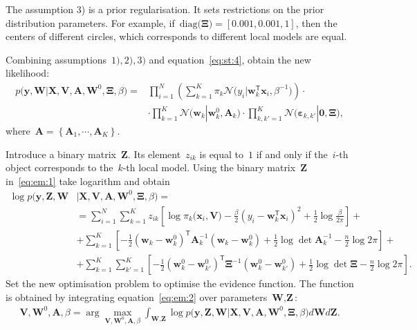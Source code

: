 \documentclass[12pt, twoside]{article}
\numberwithin{equation}{section}
\begin{document}
The assumption 3) is a prior regularisation. It sets restrictions on the prior distribution parameters. For example, if~$\text{diag}\bigr(\bm{\Xi}\bigr)=[0.001, 0.001, 1]$, then the centers of different circles, which corresponds to different local models are equal.

Combining assumptions~$1), 2), 3)$ and equation~\eqref{eq:st:4}, obtain the new likelihood:
\[
\label{eq:em:1}
\begin{aligned}
p\bigr(\mathbf{y}, \mathbf{W}|\mathbf{X}, \mathbf{V}, \textbf{A}, \textbf{W}^{0}, \bm{\Xi}, \beta\bigr) = &\prod_{i=1}^{N}\left(\sum_{k=1}^{K}\pi_{k}\mathcal{N}\bigr(y_{i}|\mathbf{w}_{k}^{\mathsf{T}}\mathbf{x}_{i}, \beta^{-1}\bigr)\right)\cdot\\
&\cdot\prod_{k=1}^{K}\mathcal{N}\bigr(\mathbf{w}_{k}|\mathbf{w}^{0}_{k}, \mathbf{A}_{k}\bigr)\cdot\prod_{k,k'=1}^{K}\mathcal{N}\bigr(\bm{\varepsilon}_{k,k'}|\mathbf{0},  \bm{\Xi}\bigr),
\end{aligned}
\]
 where~$\mathbf{A} = \left\{\mathbf{A}_1, \cdots, \mathbf{A}_K\right\}.$
 
Introduce a binary matrix~$\mathbf{Z}$. Its element~$z_{ik}$ is equal to~$1$ if and only if the~$i$-th object corresponds to the~$k$-th local model.
Using the binary matrix~$\mathbf{Z}$ in~\eqref{eq:em:1} take logarithm and obtain
\[
\label{eq:em:2}
\begin{aligned}
\log p\bigr(\mathbf{y}, \mathbf{Z}, \mathbf{W}&|\mathbf{X}, \mathbf{V}, \textbf{A}, \textbf{W}^{0},  \bm{\Xi}, \beta\bigr) =\\
&= \sum_{i=1}^{N}\sum_{k=1}^{K}z_{ik}\left[\log\pi_k\bigr(\textbf{x}_i, \textbf{V}\bigr) - \frac{\beta}{2}\left(y_{i} - \textbf{w}_{k}^{\mathsf{T}}\textbf{x}_{i}\right)^{2} + \frac{1}{2}\log\frac{\beta}{2\pi}\right] +\\
&+ \sum_{k=1}^{K}\left[-\frac{1}{2}\left(\textbf{w}_{k} - \textbf{w}_{k}^{0}\right)^{\mathsf{T}}\textbf{A}_{k}^{-1}\left(\textbf{w}_{k} - \textbf{w}_{k}^{0}\right) + \frac{1}{2}\log\det\textbf{A}^{-1}_{k} - \frac{n}{2}\log2\pi\right]+\\
&+ \sum_{k=1}^{K}\sum_{k'=1}^{K}\left[-\frac{1}{2}\left(\textbf{w}_{k}^{0}-\textbf{w}_{k'}^{0}\right)^{\mathsf{T}}\bm{\Xi}^{-1}\left(\textbf{w}_{k}^{0}-\textbf{w}_{k'}^{0}\right) +\frac{1}{2}\log\det \bm{\Xi} -\frac{n}{2}\log{2\pi}\right].
\end{aligned}
\]
Set the new optimisation problem to optimise the evidence function. The function is obtained by integrating equation~\eqref{eq:em:2} over parameters~$\textbf{W}, \textbf{Z}$:
\[
\label{eq:em:3}
\begin{aligned}
\mathbf{V}, \mathbf{W}^0, \textbf{A},  \beta = \arg\max_{\mathbf{V}, \mathbf{W}^0, \textbf{A}, \beta} \int_{\textbf{W}, \textbf{Z}}\log p\bigr(\mathbf{y}, \textbf{Z}, \textbf{W}|\mathbf{X}, \mathbf{V}, \textbf{A}, \textbf{W}^{0}, \bm{\Xi}, \beta\bigr)d\textbf{W}d\textbf{Z}.
\end{aligned}
\]
\end{document}
